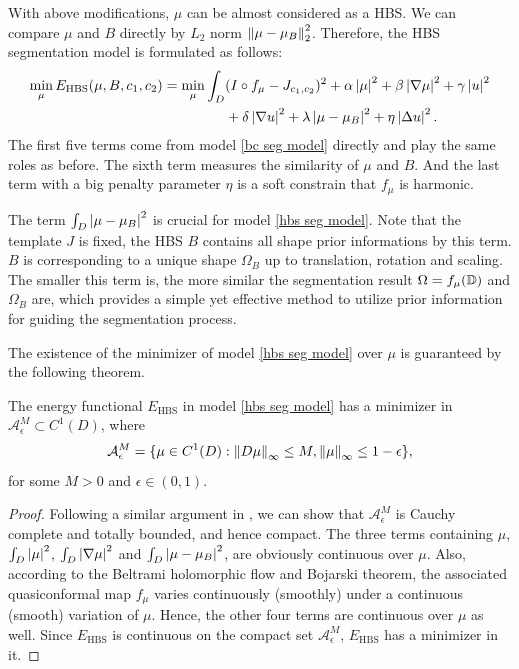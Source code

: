 \documentclass[review,onefignum,onetabnum]{siamonline190516}
\begin{document}
With above modifications, $\mu$ can be almost considered as a HBS. We can compare  $\mu$ and $B$ directly by $L_2$ norm $\left\Vert \mu - \mu_B \right\Vert^2_2$. Therefore, the HBS segmentation model is formulated as follows:
\begin{equation}\label{hbs seg model}
    \begin{split}
        \min_{\mu} E_{\text{HBS}}(\mu, B, c_1, c_2) = 
        \min_{\mu} \int_D 
        & (I \circ f_\mu - J_{c_1,c_2})^2 
        + \alpha \abs{\mu}^2 + \beta \abs{\nabla \mu}^2 
        + \gamma \abs{u}^2 \\
        & + \delta \abs{\nabla u}^2
        + \lambda \abs{\mu - \mu_B}^2 + \eta \abs{\Delta u}^2.
    \end{split}
\end{equation}
The first five terms come from model \ref{bc seg model} directly and play the same roles as before. The sixth term measures the similarity of $\mu$ and $B$. And the last term with a big penalty parameter $\eta$ is a soft constrain that $f_\mu$ is harmonic.

The term $\int_D \left\vert \mu - \mu_B \right\vert^2$ is crucial for model \ref{hbs seg model}. Note that the template $J$ is fixed, the HBS $B$ contains all shape prior informations by this term. $B$ is corresponding to a unique shape $\Omega_B$ up to translation, rotation and scaling. The smaller this term is, the more similar the segmentation result $\Omega = f_\mu(\mathbb{D})$ and $\Omega_B$ are, which provides a simple yet effective method to utilize prior information for guiding the segmentation process.

The existence of the minimizer of model \ref{hbs seg model} over $\mu$ is guaranteed by the following theorem.
\begin{theorem}\label{existence}
    The energy functional $E_{\text{HBS}}$ in model \ref{hbs seg model} has a minimizer in $\mathcal{A}^M_\epsilon \subset C^1(D)$, where
    \begin{equation*}
        \mathcal{A}^M_\epsilon = \{ \mu \in C^1(D) : \left\Vert D \mu \right\Vert_\infty \le M, \left\Vert \mu \right\Vert_\infty \le 1 - \epsilon \},
    \end{equation*}
    for some $M > 0$ and $\epsilon \in (0, 1)$.
\end{theorem}

\begin{proof}
    Following a similar argument in \cite{}, we can show that $\mathcal{A}^M_\epsilon$ is Cauchy complete and totally bounded, and hence compact. The three terms containing $\mu$, $\int_D \left\vert \mu \right\vert^2$, $\int_D \left\vert \nabla \mu \right\vert^2$ and $\int_D \left\vert \mu - \mu_B \right\vert^2$, are obviously continuous over $\mu$. Also, according to the Beltrami holomorphic flow and Bojarski theorem, the associated quasiconformal map $f_\mu$ varies continuously (smoothly) under a continuous (smooth) variation of $\mu$. Hence, the other four terms are continuous over $\mu$ as well. Since $E_\text{HBS}$ is continuous on the compact set $\mathcal{A}^M_\epsilon$, $E_\text{HBS}$ has a minimizer in it.
\end{proof}
\end{document}
